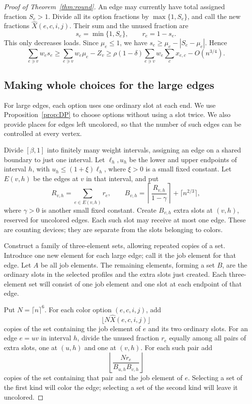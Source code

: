 \documentclass[11pt]{article}
\theoremstyle{definition}\newtheorem{algorithm}{Algorithm}[section]
\numberwithin{equation}{section}
\theoremstyle{remark}\newtheorem*{remark}{Remark}
\begin{document}
\begin{proof}[Proof of Theorem~\ref{thm:round}]
An edge may currently have total assigned fraction $S_e>1$.
Divide all its option fractions by $\max\{1,S_e\}$, and call the new
fractions $\widehat X(e,c,i,j)$. Their sum and the unused fraction are
\[
 s_e=\min\{1,S_e\},\qquad r_e=1-s_e.
\]
This only decreases loads. Since $\mu_e\le1$, we have
$s_e\ge\mu_e-|S_e-\mu_e|$. Hence
\begin{equation}\label{eq:capture}
 \sum_{e\ni v}w_es_e
 \ge\sum_{e\ni v}w_e\mu_e-Z_v
 \ge\rho(1-\delta)\sum_{e\ni v}w_e\sum_cx_{e,c}
       -O(n^{3/4}).
\end{equation}

\subsection*{Making whole choices for the large edges}
For large edges, each option uses one ordinary slot at each end. We use
Proposition~\ref{prop:DP} to choose options without using a slot twice.
We also provide places for edges left uncolored, so that the number of
such edges can be controlled at every vertex.

Divide $[\beta,1]$ into finitely many weight intervals, assigning an edge
on a shared boundary to just one interval. Let $\ell_h,u_h$ be the lower
and upper endpoints of interval $h$, with
$u_h\le(1+\xi)\ell_h$, where $\xi>0$ is a small fixed constant.
Let $E(v,h)$ be the edges at $v$ in that interval, and put
\[
 R_{v,h}=\sum_{e\in E(v,h)}r_e,
 \qquad
 B_{v,h}=\left\lceil\frac{R_{v,h}}{1-\gamma}\right\rceil
                   +\lceil n^{2/3}\rceil,
\]
where $\gamma>0$ is another small fixed constant.
Create $B_{v,h}$ extra slots at $(v,h)$, reserved for uncolored edges.
Each such slot may receive at most one edge. These are counting devices;
they are separate from the slots belonging to colors.

Construct a family of three-element sets, allowing repeated copies of a
set. Introduce one new element for each large edge; call it the job
element for that edge. Let $A$ be all job elements. The remaining elements,
forming a set $B$, are the ordinary slots in the selected profiles
and the extra slots just created. Each three-element set will consist of
one job element and one slot at each endpoint of that edge.

Put $N=\lceil n\rceil^6$. For each color option $(e,c,i,j)$, add
\[
 \lfloor N\widehat X(e,c,i,j)\rfloor
\]
copies of the set containing the job element of $e$ and its two ordinary
slots. For an edge $e=uv$ in interval $h$, divide the unused fraction
$r_e$ equally among all pairs of extra slots, one at $(u,h)$ and one at
$(v,h)$. For each such pair add
\[
 \left\lfloor\frac{Nr_e}{B_{u,h}B_{v,h}}\right\rfloor
\]
copies of the set containing that pair and the job element of $e$.
Selecting a set of the first kind will color the edge; selecting a set
of the second kind will leave it uncolored.



\end{proof}
\end{document}
